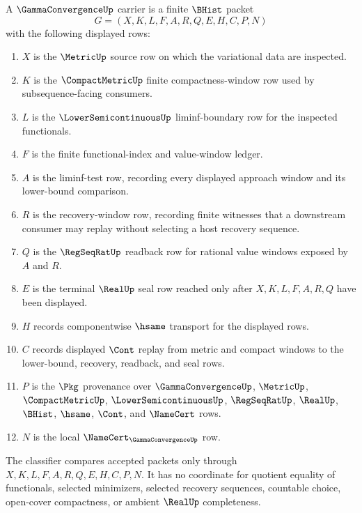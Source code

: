 \begin{definition}
\label{def:gamma-convergence-carrier}
A $\GammaConvergenceUp$ carrier is a finite $\BHist$ packet
$$
G=(X,K,L,F,A,R,Q,E,H,C,P,N)
$$
with the following displayed rows:
\begin{enumerate}
\item $X$ is the $\MetricUp$ source row on which the variational data are inspected.
\item $K$ is the $\CompactMetricUp$ finite compactness-window row used by subsequence-facing consumers.
\item $L$ is the $\LowerSemicontinuousUp$ liminf-boundary row for the inspected functionals.
\item $F$ is the finite functional-index and value-window ledger.
\item $A$ is the liminf-test row, recording every displayed approach window and its lower-bound comparison.
\item $R$ is the recovery-window row, recording finite witnesses that a downstream consumer may replay without selecting a host recovery sequence.
\item $Q$ is the $\RegSeqRatUp$ readback row for rational value windows exposed by $A$ and $R$.
\item $E$ is the terminal $\RealUp$ seal row reached only after $X,K,L,F,A,R,Q$ have been displayed.
\item $H$ records componentwise $\hsame$ transport for the displayed rows.
\item $C$ records displayed $\Cont$ replay from metric and compact windows to the lower-bound, recovery, readback, and seal rows.
\item $P$ is the $\Pkg$ provenance over $\GammaConvergenceUp$, $\MetricUp$, $\CompactMetricUp$, $\LowerSemicontinuousUp$, $\RegSeqRatUp$, $\RealUp$, $\BHist$, $\hsame$, $\Cont$, and $\NameCert$ rows.
\item $N$ is the local $\NameCert_{\GammaConvergenceUp}$ row.
\end{enumerate}
The classifier compares accepted packets only through $X,K,L,F,A,R,Q,E,H,C,P,N$. It has no coordinate for quotient equality of functionals, selected minimizers, selected recovery sequences, countable choice, open-cover compactness, or ambient $\RealUp$ completeness.
\end{definition}

